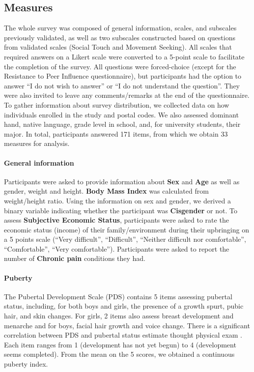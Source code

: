 \documentclass[preprint, 3p,
authoryear]{elsarticle} %
\begin{document}
\hypertarget{measures}{%
\subsection{Measures}\label{measures}}

The whole survey was composed of general information, scales, and
subscales previously validated, as well as two subscales constructed
based on questions from validated scales (Social Touch and Movement
Seeking). All scales that required answers on a Likert scale were
converted to a 5-point scale to facilitate the completion of the survey.
All questions were forced-choice (except for the Resistance to Peer
Influence questionnaire), but participants had the option to answer ``I
do not wish to answer'' or ``I do not understand the question''. They
were also invited to leave any comments/remarks at the end of the
questionnaire. To gather information about survey distribution, we
collected data on how individuals enrolled in the study and postal
codes. We also assessed dominant hand, native language, grade level in
school, and, for university students, their major. In total,
participants answered 171 items, from which we obtain 33 measures for
analysis.

\hypertarget{general-information}{%
\paragraph{General information}\label{general-information}}

Participants were asked to provide information about \textbf{Sex} and
\textbf{Age} as well as gender, weight and height. \textbf{Body Mass
Index} was calculated from weight/height ratio. Using the information on
sex and gender, we derived a binary variable indicating whether the
participant was \textbf{Cisgender} or not. To assess \textbf{Subjective
Economic Status}, participants were asked to rate the economic status
(income) of their family/environment during their upbringing on a 5
points scale (``Very difficult'', ``Difficult'', ``Neither difficult nor
comfortable'', ``Comfortable'', ``Very comfortable''). Participants were
asked to report the number of \textbf{Chronic pain} conditions they had.

\hypertarget{puberty}{%
\paragraph{Puberty}\label{puberty}}

The Pubertal Development Scale (PDS) \citep{petersen_self-report_1988}
contains 5 items assessing pubertal status, including, for both boys and
girls, the presence of a growth spurt, pubic hair, and skin changes. For
girls, 2 items also assess breast development and menarche and for boys,
facial hair growth and voice change. There is a significant correlation
between PDS and pubertal status estimate thought physical exam
\citep{shirtcliff_pubertal_2009}. Each item ranges from 1 (development
has not yet begun) to 4 (development seems completed). From the mean on
the 5 scores, we obtained a continuous puberty index.
\end{document}

